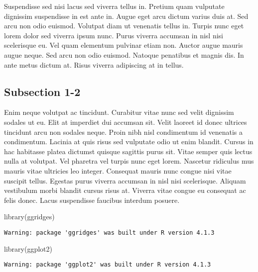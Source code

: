 \documentclass[
  letterpaper,
  DIV=11,
  numbers=noendperiod,
  oneside]{scrreprt}
\newenvironment{Shaded}{\begin{snugshade}}{\end{snugshade}}
\newcommand{\FunctionTok}[1]{\textcolor[rgb]{0.28,0.35,0.67}{#1}}
\newcommand{\NormalTok}[1]{\textcolor[rgb]{0.00,0.23,0.31}{#1}}
\begin{document}
Suspendisse sed nisi lacus sed viverra tellus in. Pretium quam vulputate
dignissim suspendisse in est ante in. Augue eget arcu dictum varius duis
at. Sed arcu non odio euismod. Volutpat diam ut venenatis tellus in.
Turpis nunc eget lorem dolor sed viverra ipsum nunc. Purus viverra
accumsan in nisl nisi scelerisque eu. Vel quam elementum pulvinar etiam
non. Auctor augue mauris augue neque. Sed arcu non odio euismod. Natoque
penatibus et magnis dis. In ante metus dictum at. Risus viverra
adipiscing at in tellus.

\hypertarget{subsection-1-2}{%
\subsection{Subsection 1-2}\label{subsection-1-2}}

Enim neque volutpat ac tincidunt. Curabitur vitae nunc sed velit
dignissim sodales ut eu. Elit at imperdiet dui accumsan sit. Velit
laoreet id donec ultrices tincidunt arcu non sodales neque. Proin nibh
nisl condimentum id venenatis a condimentum. Lacinia at quis risus sed
vulputate odio ut enim blandit. Cursus in hac habitasse platea dictumst
quisque sagittis purus sit. Vitae semper quis lectus nulla at volutpat.
Vel pharetra vel turpis nunc eget lorem. Nascetur ridiculus mus mauris
vitae ultricies leo integer. Consequat mauris nunc congue nisi vitae
suscipit tellus. Egestas purus viverra accumsan in nisl nisi
scelerisque. Aliquam vestibulum morbi blandit cursus risus at. Viverra
vitae congue eu consequat ac felis donec. Lacus suspendisse faucibus
interdum posuere.

\begin{Shaded}
\begin{Highlighting}[]
\FunctionTok{library}\NormalTok{(ggridges)}
\end{Highlighting}
\end{Shaded}

\begin{verbatim}
Warning: package 'ggridges' was built under R version 4.1.3
\end{verbatim}

\begin{Shaded}
\begin{Highlighting}[]
\FunctionTok{library}\NormalTok{(ggplot2)}
\end{Highlighting}
\end{Shaded}

\begin{verbatim}
Warning: package 'ggplot2' was built under R version 4.1.3
\end{verbatim}
\end{document}

